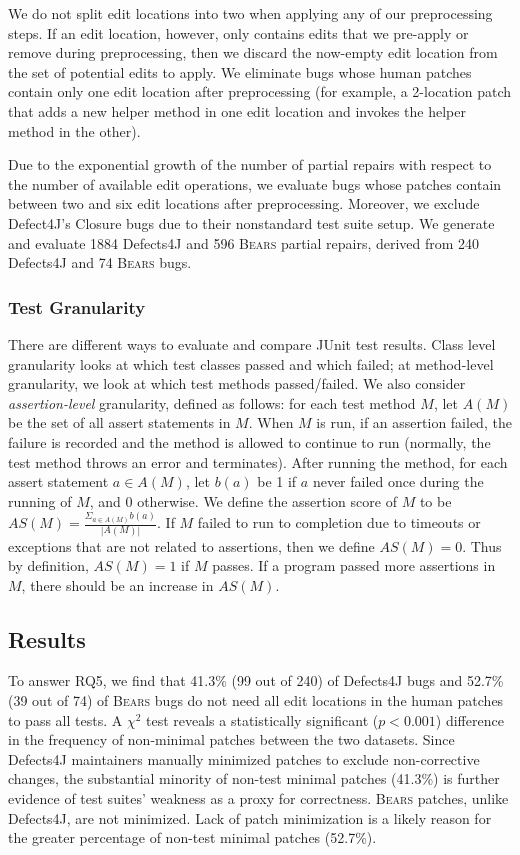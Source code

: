 \documentclass[10pt, conference]{IEEEtran}
\newcommand\bears{\textsc{Bears}\xspace}
\begin{document}
We do not split edit locations into two when applying any of our preprocessing steps. 
If an edit location, however, only contains edits that we pre-apply or remove during 
preprocessing, then we discard the now-empty edit location from the set of 
potential edits to apply. We eliminate bugs whose human patches contain only 
one edit location after preprocessing (for example, a 2-location patch that adds a new 
helper method in one edit location and invokes the helper method in the other). 

Due to the exponential growth of the number of partial repairs with respect 
to the number of available edit operations, we evaluate bugs whose patches 
contain between two and six edit locations after preprocessing.
Moreover, we exclude Defect4J's Closure bugs due to 
their nonstandard test suite setup.
We generate and evaluate 1884 Defects4J and 596 \bears partial repairs,
derived from 240 Defects4J and 74 \bears bugs.

\subsubsection{Test Granularity}

There are different ways to evaluate and compare JUnit test results. Class level granularity
looks at which test classes passed and which failed; at method-level
granularity, we look at which test methods passed/failed.
We also consider \emph{assertion-level} granularity, defined as follows:
for each test method $M$, let $A(M)$ be the set of all assert statements in $M$. 
When $M$ is run, if an assertion failed, the failure is recorded and the method 
is allowed to continue to run (normally, the test method throws an 
error and terminates). After running the method, for each assert statement 
$a\in A(M)$, let $b(a)$ be 1 if $a$ never failed once during the running of $M$, 
and 0 otherwise. We define the assertion score of $M$ to be 
$AS(M)=\frac{\Sigma_{a\in A(M)}b(a)}{|A(M)|}$. If $M$ failed to run to completion 
due to timeouts or exceptions that are not related to assertions, then we define 
$AS(M)=0$. Thus by definition, $AS(M)=1$ if $M$ passes. If a program passed more 
assertions in $M$, there should be an increase in $AS(M)$.


\subsection{Results}

To answer RQ5, we find that 41.3\%  (99 out of 240) of Defects4J bugs and 52.7\% (39 out of 74) of
\bears bugs do not need all edit locations in the human patches
to pass all tests.
A $\chi^2$ test reveals a statistically significant ($p < 0.001$) difference in the frequency
of non-minimal patches between the two datasets.
Since Defects4J maintainers manually minimized patches to exclude
non-corrective changes, the substantial minority of non-test minimal patches
(41.3\%) is further evidence of test suites' weakness as a proxy for correctness.
\bears patches, unlike Defects4J, are not minimized. Lack of patch minimization
is a likely reason for the greater percentage of non-test minimal patches (52.7\%).
\end{document}
